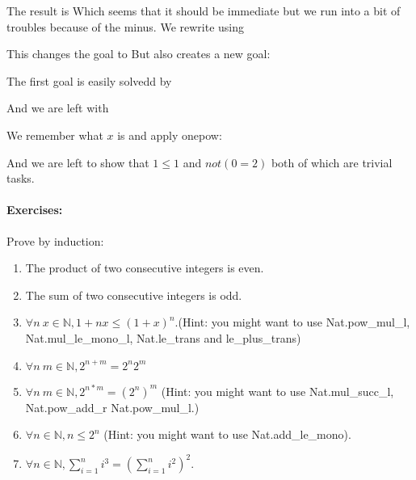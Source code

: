 The result is
Which seems that it should be immediate but we run into a bit of troubles because of the minus. We rewrite using

This changes the goal to
 But also creates a new goal:

The first goal is easily solvedd by


And we are left with 


We remember what $x$ is and apply onepow:

And we are left to show that $1\le 1$ and $not (0=2)$ both of which are trivial tasks.


\paragraph{\bf Exercises:} 
Prove by induction:
\begin{enumerate}
\item The product of two consecutive integers is even.
\item The sum of two consecutive integers is odd.
 \item $\forall n \ x \in\mathbb{N},  1+nx\le  (1+x)^n.$(Hint: you might want to use Nat.pow\_mul\_l, Nat.mul\_le\_mono\_l,  Nat.le\_trans and le\_plus\_trans)
 \item $\forall n \ m\in \mathbb{N},  2^{n+m}= 2^{n}2^{m}$ 
 \item $\forall n \ m\in \mathbb{N},  2^{n*m}= (2^{n})^{m}$ (Hint: you might want to use Nat.mul\_succ\_l, Nat.pow\_add\_r  Nat.pow\_mul\_l.)

\item $\forall n\in \mathbb{N}, n\le 2^{n}$ (Hint: you might want to use Nat.add\_le\_mono).

\item $\forall n\in \mathbb{N}, \sum_{i=1}^{n}i^{3} = (\sum_{i=1}^{n}i^{2})^{2}.$


\end{enumerate}


